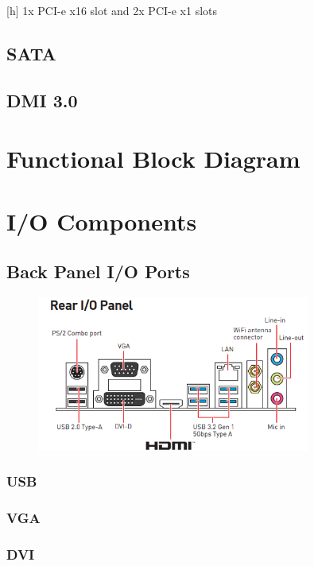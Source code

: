 \documentclass{article}
\begin{document}
\begin{center}[h]
1x PCI-e x16 slot and 2x PCI-e x1 slots
\end{center}

\subsection{SATA}

\subsection{DMI 3.0}


\section{Functional Block Diagram}

\section{I/O Components}

\subsection{Back Panel I/O Ports}

\begin{figure}[h]
	\centering
\includegraphics[width=0.8\textwidth]{backpanel.png}
\end{figure}


\subsubsection{USB}
\subsubsection{VGA}
\subsubsection{DVI}
\end{document}
